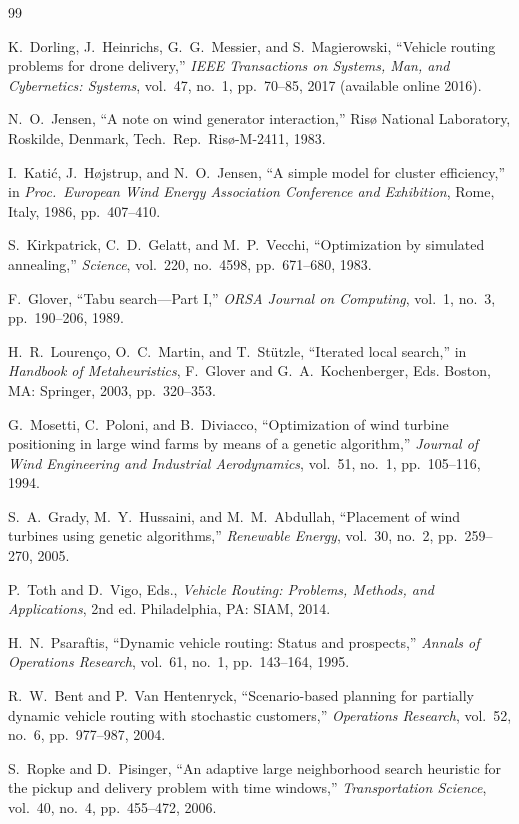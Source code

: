 \documentclass[11pt,a4paper]{article}
\begin{document}
\begin{thebibliography}{99}

K.~Dorling, J.~Heinrichs, G.~G.~Messier, and S.~Magierowski,
``Vehicle routing problems for drone delivery,''
\emph{IEEE Transactions on Systems, Man, and Cybernetics: Systems},
vol.~47, no.~1, pp.~70--85, 2017 (available online 2016).

N.~O.~Jensen,
``A note on wind generator interaction,''
Ris\o{} National Laboratory, Roskilde, Denmark, Tech.\ Rep.\ Ris\o-M-2411, 1983.

I.~Kati\'c, J.~H\o{}jstrup, and N.~O.~Jensen,
``A simple model for cluster efficiency,''
in \emph{Proc.\ European Wind Energy Association Conference and Exhibition},
Rome, Italy, 1986, pp.~407--410.

S.~Kirkpatrick, C.~D.~Gelatt, and M.~P.~Vecchi,
``Optimization by simulated annealing,''
\emph{Science}, vol.~220, no.~4598, pp.~671--680, 1983.

F.~Glover,
``Tabu search---Part I,''
\emph{ORSA Journal on Computing}, vol.~1, no.~3, pp.~190--206, 1989.

H.~R.~Louren\c{c}o, O.~C.~Martin, and T.~St\"utzle,
``Iterated local search,''
in \emph{Handbook of Metaheuristics}, F.~Glover and G.~A.~Kochenberger, Eds.
Boston, MA: Springer, 2003, pp.~320--353.

G.~Mosetti, C.~Poloni, and B.~Diviacco,
``Optimization of wind turbine positioning in large wind farms by means of a
genetic algorithm,''
\emph{Journal of Wind Engineering and Industrial Aerodynamics},
vol.~51, no.~1, pp.~105--116, 1994.

S.~A.~Grady, M.~Y.~Hussaini, and M.~M.~Abdullah,
``Placement of wind turbines using genetic algorithms,''
\emph{Renewable Energy}, vol.~30, no.~2, pp.~259--270, 2005.

P.~Toth and D.~Vigo, Eds.,
\emph{Vehicle Routing: Problems, Methods, and Applications}, 2nd ed.
Philadelphia, PA: SIAM, 2014.

H.~N.~Psaraftis,
``Dynamic vehicle routing: Status and prospects,''
\emph{Annals of Operations Research}, vol.~61, no.~1, pp.~143--164, 1995.

R.~W.~Bent and P.~Van Hentenryck,
``Scenario-based planning for partially dynamic vehicle routing with stochastic
customers,''
\emph{Operations Research}, vol.~52, no.~6, pp.~977--987, 2004.

S.~Ropke and D.~Pisinger,
``An adaptive large neighborhood search heuristic for the pickup and delivery
problem with time windows,''
\emph{Transportation Science}, vol.~40, no.~4, pp.~455--472, 2006.

\end{thebibliography}
\end{document}
